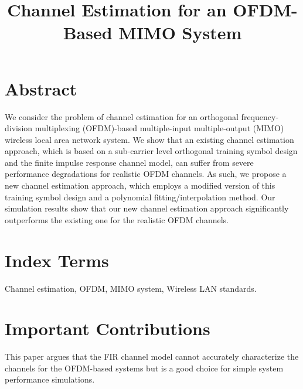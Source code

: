 \documentclass[11pt,draftnofoot,onecolumn]{IEEEtran}
\def\spacingset#1{\def\baselinestretch{#1}\small\normalsize}
\begin{document}
\spacingset{1.5}


\title{Channel Estimation for an OFDM-Based MIMO System}
%
\author{
\and {}
%
}
%
%
\maketitle%
%


\section*{Abstract}

We consider the problem of channel estimation for an orthogonal
frequency-division multiplexing (OFDM)-based multiple-input
multiple-output (MIMO) wireless local area network system. We show
that an existing channel estimation approach, which is based on a
sub-carrier level orthogonal training symbol design and the finite
impulse response channel model, can suffer from severe performance
degradations for realistic OFDM channels. As such, we propose a new
channel estimation approach, which employs a modified version of
this training symbol design and a polynomial fitting/interpolation
method. Our simulation results show that our new channel estimation
approach significantly outperforms the existing one for the
realistic OFDM channels.


\section*{ Index Terms}

Channel estimation, OFDM, MIMO system, Wireless LAN standards.


\section*{Important Contributions}

This paper argues that the FIR channel model cannot accurately
characterize the channels for the OFDM-based systems but is a good choice for simple system performance simulations.
\end{document}

